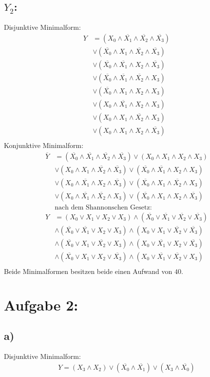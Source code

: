 \documentclass[]{article}
\newcommand{\V}{\lor}
\newcommand{\A}{\land}
\newcommand{\T}[1]{\overline{#1}}
\begin{document}
\subsection*{$Y_2$:}
	Disjunktive Minimalform:
	\begin{align*}
		Y &= (X_0 \A \T{X_1} \A \T{X_2} \A \T{X_3})\\
			&\V (\T{X_0} \A X_1 \A \T{X_2} \A \T{X_3})\\
			&\V (\T{X_0} \A \T{X_1} \A X_2 \A \T{X_3})\\
			&\V (\T{X_0} \A \T{X_1} \A \T{X_2} \A X_3)\\
			&\V (\T{X_0} \A X_1 \A X_2 \A X_3)\\
			&\V (X_0 \A \T{X_1} \A X_2 \A X_3)\\
			&\V (X_0 \A X_1 \A \T{X_2} \A X_3)\\
			&\V (X_0 \A X_1 \A X_2 \A \T{X_3})\\
	\end{align*}
	Konjunktive Minimalform:
	\begin{align*}
		\T{Y} &= (\T{X_0} \A \T{X_1} \A \T{X_2} \A \T{X_3}) \V (X_0 \A X_1 \A X_2 \A X_3)\\
		 	&\V (X_0 \A X_1 \A \T{X_2} \A \T{X_3}) \V (\T{X_0} \A \T{X_1} \A X_2 \A X_3)\\
		 	&\V (X_0 \A \T{X_1} \A X_2 \A \T{X_3}) \V (\T{X_0} \A X_1 \A \T{X_2} \A X_3)\\
			 &\V (X_0 \A \T{X_1} \A \T{X_2} \A X_3) \V (\T{X_0} \A X_1 \A X_2 \A \T{X_3})\\
			&\text{nach dem Shannonschen Gesetz:} \\
		Y &= (X_0 \V X_1 \V X_2 \V X_3) \A (\T{X_0} \V \T{X_1} \V \T{X_2} \V \T{X_3})\\
		&\A (\T{X_0} \V \T{X_1} \V X_2 \V X_3) \A (X_0 \V X_1 \V \T{X_2} \V \T{X_3})\\
		&\A (\T{X_0} \V X_1 \V \T{X_2} \V X_3) \A (X_0 \V \T{X_1} \V X_2 \V \T{X_3})\\
		&\A (\T{X_0} \V X_1 \V X_2 \V \T{X_3}) \A (X_0 \V \T{X_1} \V \T{X_2} \V X_3)\\
	\end{align*}
	Beide Minimalformen besitzen beide einen Aufwand von $40$.


\section*{Aufgabe 2:}
\subsection*{a)}
	Disjunktive Minimalform:
	\begin{align*}
		Y = (X_3 \A X_2) \V (\T{X_0} \A \T{X_1}) \V (X_3 \A \T{X_0})
	\end{align*}
\end{document}
